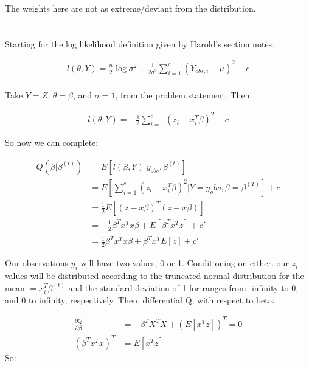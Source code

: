 \documentclass{article}\usepackage[]{graphicx}\usepackage[]{color}
\begin{document}
The weights here are not as extreme/deviant from the distribution.

\section{}

\subsection{}

Starting for the log likelihood definition given by Harold's section notes:

\begin{align*}
l(\theta, Y) = \frac{n}{2} \log \sigma^2 - \frac{1}{2 \sigma^2} \sum_{i=1}^{c} (Y_{obs,i} - \mu)^2 - c\\
\end{align*}

Take \(Y = Z\), \(\theta = \beta\), and \(\sigma = 1\), from the problem statement.  Then:

\begin{align*}
l(\theta, Y) = -\frac{1}{2} \sum_{i=1}^c (z_i - x_i^T \beta)^2 - c
\end{align*}

So now we can complete:

\begin{align*}
Q(\beta | \beta^{(t)}) &= E[l(\beta, Y) | y_{obs}, \beta^{(t)}]\\
				&= E[\sum_{i=1}^c (z_i - x_i^T \beta)^2 | Y = y_obs, \beta = \beta^{(T)}] + c\\
				&= \frac{1}{2} E[(z - x\beta)^T(z- x\beta)]\\
				&=-\frac{1}{2} \beta^T x^T x \beta + E[\beta^T x^T z] + c'\\
				&= \frac{1}{2}\beta^T x^T x \beta + \beta^T x^T E[z] + c'
\end{align*}

Our observations \(y_i\) will have two values, 0 or 1.  Conditioning on either, our \(z_i\) values will be distributed according to the truncated normal distribution for the mean \(=x_i^T \beta^{(t)}\) and the standard deviation of 1 for ranges from -infinity to 0, and 0 to infinity, respectively.  Then, differential Q, with respect to beta:

\begin{align*}
\frac{\partial Q}{\partial \beta} &= -\beta^T X^T X + (E[x^T z])^T = 0\\
(\beta^T x^T x)^T &= E[x^T z]
\end{align*}
So:
\end{document}
